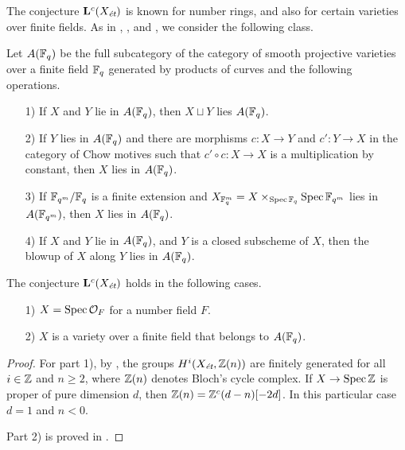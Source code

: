 \documentclass{article}
\numberwithin{equation}{section}
\begin{document}
The conjecture $\mathbf{L}^c (X_\et)$ is known for number rings, and also for
certain varieties over finite fields. As in \cite{Soule-1984},
\cite{Geisser-2004}, and \cite{Morin-2014}, we consider the following class.

\begin{definition}
  Let $A (\FF_q)$ be the full subcategory of the category of smooth projective
  varieties over a finite field $\FF_q$ generated by products of curves and the
  following operations.
  \begin{enumerate}
  \item[1)] If $X$ and $Y$ lie in $A (\FF_q)$, then $X \sqcup Y$ lies
    $A (\FF_q)$.
  \item[2)] If $Y$ lies in $A (\FF_q)$ and there are morphisms $c\colon X\to Y$
    and $c'\colon Y\to X$ in the category of Chow motives such that
    $c'\circ c\colon X\to X$ is a multiplication by constant, then
    $X$ lies in $A (\FF_q)$.
  \item[3)] If $\FF_{q^m}/\FF_q$ is a finite extension and
    $X_{\FF_q^m} = X \times_{\Spec \FF_q} \Spec \FF_{q^m}$ lies in
    $A (\FF_{q^m})$, then $X$ lies in $A (\FF_q)$.
  \item[4)] If $X$ and $Y$ lie in $A (\FF_q)$, and $Y$ is a closed subscheme of
    $X$, then the blowup of $X$ along $Y$ lies in $A (\FF_q)$.
  \end{enumerate}
\end{definition}

\begin{lemma}
  \label{lemma:Lc(Xet)-holds-for-OF-and-A(Fq)}
  The conjecture $\mathbf{L}^c (X_\et)$ holds in the following cases.

  \begin{enumerate}
  \item[1)] $X = \Spec \mathcal{O}_F$ for a number field $F$.

  \item[2)] $X$ is a variety over a finite field that belongs to $A (\FF_q)$.
  \end{enumerate}

  \begin{proof}
    For part 1), by \cite[Theorem~5.1~(b)]{Morin-2014}, the groups
    $H^i (X_\et, \ZZ(n))$ are finitely generated for all $i \in \ZZ$ and
    $n \ge 2$, where $\ZZ (n)$ denotes Bloch's cycle complex. If
    $X \to \Spec \ZZ$ is proper of pure dimension $d$, then
    $\ZZ (n) = \ZZ^c (d-n) [-2d]$. In this particular case $d = 1$ and $n < 0$.

    Part 2) is proved in \cite[Proposition~5.7]{Morin-2014}.
  \end{proof}
\end{lemma}
\end{document}
